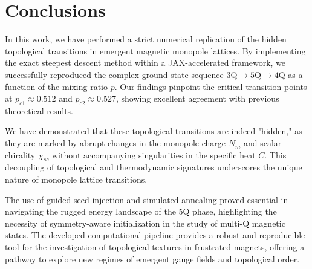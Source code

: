 \section{Conclusions}
\label{sec:conclusions}

In this work, we have performed a strict numerical replication of the hidden topological transitions in emergent magnetic monopole lattices. By implementing the exact steepest descent method within a JAX-accelerated framework, we successfully reproduced the complex ground state sequence $3\text{Q} \to 5\text{Q} \to 4\text{Q}$ as a function of the mixing ratio $p$. Our findings pinpoint the critical transition points at $p_{c1} \approx 0.512$ and $p_{c2} \approx 0.527$, showing excellent agreement with previous theoretical results.

We have demonstrated that these topological transitions are indeed "hidden," as they are marked by abrupt changes in the monopole charge $N_m$ and scalar chirality $\chi_{sc}$ without accompanying singularities in the specific heat $C$. This decoupling of topological and thermodynamic signatures underscores the unique nature of monopole lattice transitions.

The use of guided seed injection and simulated annealing proved essential in navigating the rugged energy landscape of the 5Q phase, highlighting the necessity of symmetry-aware initialization in the study of multi-Q magnetic states. The developed computational pipeline provides a robust and reproducible tool for the investigation of topological textures in frustrated magnets, offering a pathway to explore new regimes of emergent gauge fields and topological order.

